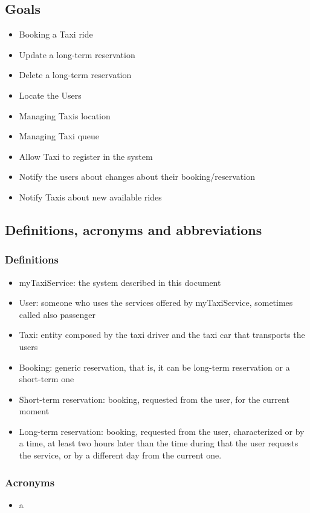 	\subsection{Goals}
	\begin{itemize}
		\item Booking a Taxi ride
		\item Update a long-term reservation
		\item Delete a long-term reservation
		\item Locate the Users
		\item Managing Taxis location
		\item Managing Taxi queue
		\item Allow Taxi to register in the system
		\item Notify the users about changes about their booking/reservation
		\item Notify Taxis about new available rides
	\end{itemize}
	
	\subsection{Definitions, acronyms and abbreviations}
		\subsubsection{Definitions}
		\begin{itemize}
			\item myTaxiService: the system described in this document
			\item User: someone who uses the services offered by myTaxiService, sometimes called also passenger
			\item Taxi: entity composed by the taxi driver and the taxi car that transports the users
			\item Booking: generic reservation, that is, it can be long-term reservation or a short-term one
			\item Short-term reservation: booking, requested from the user, for the current moment
			\item Long-term reservation: booking, requested from the user, characterized or by a time, at least two hours later than the time during that the user requests the service, or by a different day from the current one. 
		\end{itemize}
		\subsubsection{Acronyms}
		\begin{itemize}
			\item a
		\end{itemize}
